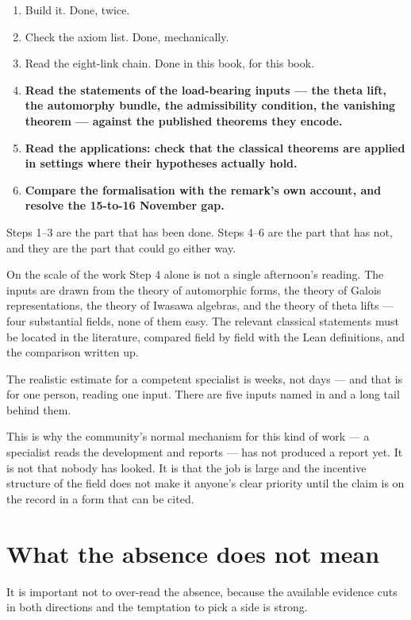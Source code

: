 \begin{enumerate}
\item Build it. Done, twice.
\item Check the axiom list. Done, mechanically.
\item Read the eight-link chain. Done in this book, for this book.
\item \textbf{Read the statements of the load-bearing inputs --- the theta
lift, the automorphy bundle, the admissibility condition, the vanishing
theorem --- against the published theorems they encode.}
\item \textbf{Read the applications: check that the classical theorems are
applied in settings where their hypotheses actually hold.}
\item \textbf{Compare the formalisation with the remark's own account, and
resolve the 15-to-16 November gap.}
\end{enumerate}

Steps 1--3 are the part that has been done. Steps 4--6 are the part that has
not, and they are the part that could go either way.

\begin{seamnote}{On the scale of the work}
Step 4 alone is not a single afternoon's reading. The inputs are drawn from
the theory of automorphic forms, the theory of Galois representations, the
theory of Iwasawa algebras, and the theory of theta lifts --- four substantial
fields, none of them easy. The relevant classical statements must be located
in the literature, compared field by field with the Lean definitions, and the
comparison written up.

The realistic estimate for a competent specialist is weeks, not days --- and
that is for one person, reading one input. There are five inputs named in
 and a long tail behind them.

This is why the community's normal mechanism for this kind of work --- a
specialist reads the development and reports --- has not produced a report
yet. It is not that nobody has looked. It is that the job is large and the
incentive structure of the field does not make it anyone's clear priority
until the claim is on the record in a form that can be cited.
\end{seamnote}

\section{What the absence does not mean}It is important not to over-read the absence, because the available evidence
cuts in both directions and the temptation to pick a side is strong.


